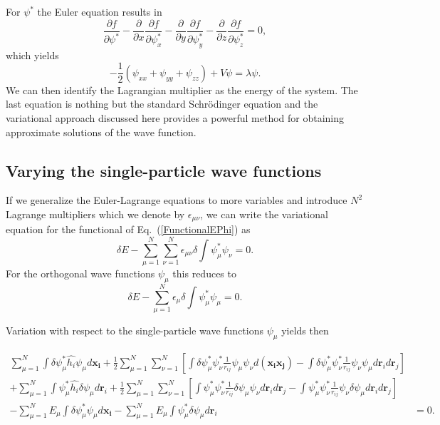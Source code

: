 For $\psi^*$ the Euler  equation results in
\[
\frac{\partial f}{\partial \psi^*}- \frac{\partial }{\partial x}\frac{\partial f}{\partial \psi^*_x}-\frac{\partial }{\partial y}\frac{\partial f}{\partial \psi^*_y}-\frac{\partial }{\partial z}\frac{\partial f}{\partial \psi^*_z}=0,
\] 
which yields 
\[
    -\frac{1}{2}(\psi_{xx}+\psi_{yy}+\psi_{zz})+V\psi=\lambda \psi.
\]
We can then identify the  Lagrangian multiplier as the energy of the system. The last equation is 
nothing but the standard 
Schr\"odinger equation and the variational  approach discussed here provides 
a powerful method for obtaining approximate solutions of the wave function.

\subsection{Varying the single-particle wave functions}

If we generalize the Euler-Lagrange equations to more variables 
and introduce $N^2$ Lagrange multipliers which we denote by 
$\epsilon_{\mu\nu}$, we can write the variational equation for the functional of Eq.~(\ref{FunctionalEPhi}) as
\begin{equation}
  \delta E - \sum_{{\mu}=1}^N\sum_{{\nu}=1}^N \epsilon_{\mu\nu} \delta
  \int \psi_{\mu}^* \psi_{\nu} = 0.
\label{variationalHFfull}
\end{equation}
For the orthogonal wave functions $\psi_{\mu}$ this reduces to
\begin{equation}
  \delta E - \sum_{{\mu}=1}^N \epsilon_{\mu} \delta
  \int \psi_{\mu}^* \psi_{\mu} = 0.
\label{variationalHF}
\end{equation}



Variation with respect to the single-particle wave functions $\psi_{\mu}$ yields then

\begin{equation}
\begin{split}
  \sum_{\mu=1}^N \int \delta\psi_{\mu}^*\hat{h_i}\psi_{\mu}
  d\mathbf{x_i}  
  + \frac{1}{2}\sum_{{\mu}=1}^N\sum_{{\nu}=1}^N \left[ \int
  \delta\psi_{\mu}^*\psi_{\nu}^*\frac{1} 
  {r_{ij}}\psi_{\mu}\psi_{\nu} d(\mathbf{x_ix_j})- \int
  \delta\psi_{\mu}^*\psi_{\nu}^*\frac{1}{r_{ij}}\psi_{\nu}\psi_{\mu}
  d\mathbf{r}_id\mathbf{r}_j \right] & \\
  + \sum_{\mu=1}^N \int \psi_{\mu}^*\hat{h_i}\delta\psi_{\mu}
  d\mathbf{r}_i 
  + \frac{1}{2}\sum_{{\mu}=1}^N\sum_{{\nu}=1}^N \left[ \int
  \psi_{\mu}^*\psi_{\nu}^*\frac{1} 
  {r_{ij}}\delta\psi_{\mu}\psi_{\nu} d\mathbf{r}_id\mathbf{r}_j- \int
  \psi_{\mu}^*\psi_{\nu}^*\frac{1}{r_{ij}}\psi_{\nu}\delta\psi_{\mu}
  d\mathbf{r}_id\mathbf{r}_j \right] & \\
  -  \sum_{{\mu}=1}^N E_{\mu} \int \delta\psi_{\mu}^*
  \psi_{\mu}d\mathbf{x_i} 
  -  \sum_{{\mu}=1}^N E_{\mu} \int \psi_{\mu}^*
  \delta\psi_{\mu}d\mathbf{r}_i & = 0.
\end{split}
\end{equation}

